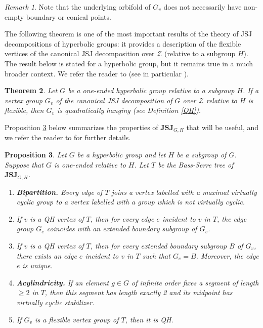 \documentclass[a4paper, 11pt]{amsart}
\newtheorem{te}{Theorem}[section]
\newtheorem{prop}[te]{Proposition}
\theoremstyle{definition}
\theoremstyle{remark}
\newtheorem{rk}[te]{Remark}
\renewcommand{\geq}{\geqslant}
\begin{document}
\begin{rk}\label{empty_boundary}
Note that the underlying orbifold of $G_v$ does not necessarily have non-empty boundary or conical points.
\end{rk}

The following theorem is one of the most important results of the theory of JSJ decompositions of hyperbolic groups: it provides a description of the flexible vertices of the canonical JSJ decomposition over $\mathcal{Z}$ (relative to a subgroup $H$). The result below is stated for a hyperbolic group, but it remains true in a much broader context. We refer the reader to \cite[Chapter III]{GL16} (see in particular \cite[Theorem 6.2]{GL16}).

\begin{te}\label{flexible implique rigide}Let $G$ be a one-ended hyperbolic group relative to a subgroup $H$. If a vertex group $G_v$ of the canonical JSJ decomposition of $G$ over $\mathcal{Z}$ relative to $H$ is flexible, then $G_v$ is quadratically hanging (see Definition \ref{QH}).\end{te}

Proposition \ref{JSJ} below summarizes the properties of $\mathbf{JSJ}_{G,H}$ that will be useful, and we refer the reader to \cite{GL16} for further details.

\begin{prop}\label{JSJ}Let $G$ be a hyperbolic group and let $H$ be a subgroup of $G$. Suppose that $G$ is one-ended relative to $H$. Let $T$ be the Bass-Serre tree of $\mathbf{JSJ}_{G,H}$.
\begin{enumerate}[(1)]
\item\textbf{Bipartition.} Every edge of $T$ joins a vertex labelled with a maximal virtually cyclic group to a vertex labelled with a group which is not virtually cyclic.
\item If $v$ is a QH vertex of $T$, then for every edge $e$ incident to $v$ in $T$, the edge group $G_e$ coincides with an extended boundary subgroup of $G_v$.
\item If $v$ is a QH vertex of $T$, then for every extended boundary subgroup $B$ of $G_v$, there exists an edge $e$ incident to $v$ in $T$ such that $G_e=B$. Moreover, the edge $e$ is unique.
\item \textbf{Acylindricity.} If an element $g\in G$ of infinite order fixes a segment of length $\geq 2$ in $T$, then this segment has length exactly 2 and its midpoint has virtually cyclic stabilizer. 
\item If $G_v$ is a flexible vertex group of $T$, then it is QH.
\end{enumerate}
\end{prop}
\end{document}
